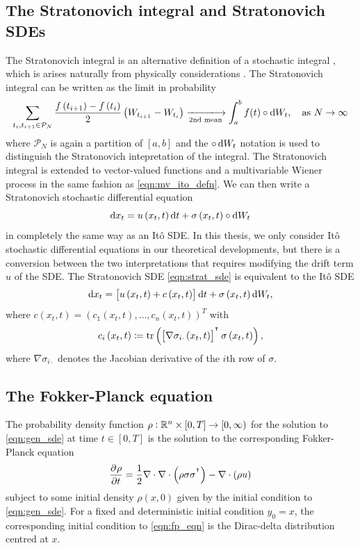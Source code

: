 \subsection{The Stratonovich integral and Stratonovich SDEs}
The Stratonovich integral is an alternative definition of a stochastic integral \citehere, which is arises naturally from physically considerations \citep{}.
The Stratonovich integral can be written as the limit in probability
\[
	\sum_{t_i, t_{i+1} \in \mathcal{P}_N}{\frac{f\left(t_{i+1}\right) - f\left(t_i\right)}{2}\left(W_{t_{i+1}} - W_{t_i}\right)} \xlongrightarrow[2\text{nd mean}]{} \int_a^{b}{f(t)\circ\dif W_t}, \quad \text{as } N \to \infty
\]
where \(\mathcal{P}_N\) is again a partition of \([a,b]\) and the \(\circ \dif W_t\) notation is used to distinguish the Stratonovich intepretation of the integral.
The Stratonovich integral is extended to vector-valued functions and a multivariable Wiener process in the same fashion as \eqref{eqn:mv_ito_defn}.
We can then write a Stratonovich stochastic differential equation
\begin{equation}
	\dif x_t = u\left(x_t, t\right)\dif t + \sigma\left(x_t, t\right)\circ \dif W_t
	\label{eqn:strat_sde}
\end{equation}
in completely the same way as an It\^o SDE.
In this thesis, we only consider It\^o stochastic differential equations in our theoretical developments, but there is a conversion between the two interpretations that requires modifying the drift term \(u\) of the SDE.
The Stratonovich SDE \eqref{eqn:strat_sde} is equivalent to the It\^o SDE \citehere
\begin{equation}
	\dif x_t = \left[u\left(x_t, t\right) + c\left(x_t, t\right)\right]\dif t + \sigma\left(x_t, t\right)\dif W_t,
	\label{eqn:strat_ito_conv}
\end{equation}
where \(c\left(x_t, t\right) = \left(c_1\left(x_t, t\right), \dotsc, c_n\left(x_t, t\right)\right)^T\) with
\[
	c_i\left(x_t, t\right) \coloneqq \mathrm{tr}\left(\left[\nabla\sigma_{i\cdot}\left(x_t, t\right)\right]^{^{\intercal}}\sigma\left(x_t, t\right)\right),
\]
where \(\nabla \sigma_{i\cdot}\) denotes the Jacobian derivative of the \(i\)th row of \(\sigma\).


\subsection{The Fokker-Planck equation}


The probability density function \(\rho: \mathbb{R}^n \times [0,T] \to [0,\infty)\) for the solution to \eqref{eqn:gen_sde} at time \(t \in [0,T]\) is the solution to the corresponding Fokker-Planck equation \citep{Risken_2012_FokkerPlanckEquationMethods}
\begin{equation}
	\dpd{\rho}{t} = \frac12\nabla\cdot\nabla\cdot\left(\rho\sigma\sigma^{\T}\right) - \nabla\cdot\left(\rho u\right)
	\label{eqn:fp_eqn}
\end{equation}
subject to some initial density \(\rho\left(x,0\right)\) given by the initial condition to \eqref{eqn:gen_sde}.
For a fixed and deterministic initial condition \(y_0 = x\), the corresponding initial condition to \eqref{eqn:fp_eqn} is the Dirac-delta distribution centred at \(x\).

